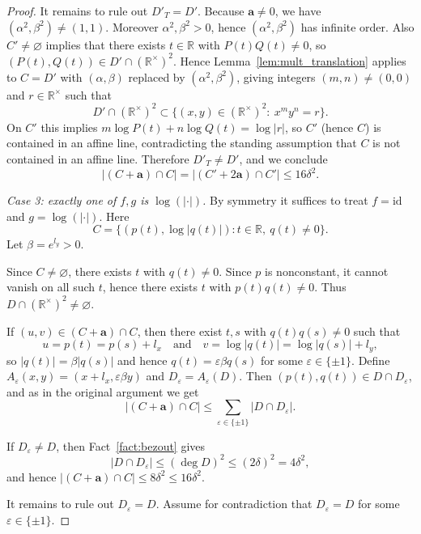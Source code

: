 \documentclass[12pt,reqno]{amsart}
\numberwithin{equation}{section}
\begin{document}
\begin{proof}
It remains to rule out $D'_T=D'$.
Because $\mathbf a\neq 0$, we have $(\alpha^2,\beta^2)\neq(1,1)$. Moreover $\alpha^2,\beta^2>0$, hence $(\alpha^2,\beta^2)$ has infinite order.
Also $C'\neq\varnothing$ implies that there exists $t\in\mathbb R$ with $P(t)Q(t)\neq0$, so $(P(t),Q(t))\in D'\cap(\mathbb R^\times)^2$.
Hence Lemma~\ref{lem:mult_translation} applies to $C=D'$ with $(\alpha,\beta)$ replaced by $(\alpha^2,\beta^2)$, giving integers $(m,n)\neq(0,0)$ and $r\in\mathbb R^\times$ such that
\[
D'\cap(\mathbb R^\times)^2\subset\{(x,y)\in(\mathbb R^\times)^2:\ x^m y^n=r\}.
\]
On $C'$ this implies $m\log P(t)+n\log Q(t)=\log|r|$, so $C'$ (hence $C$) is contained in an affine line,
contradicting the standing assumption that $C$ is not contained in an affine line.
Therefore $D'_T\neq D'$, and we conclude
\[
|(C+\mathbf a)\cap C|=|(C'+2\mathbf a)\cap C'|\le 16\delta^2.
\]

\smallskip\noindent
\emph{Case 3: exactly one of $f,g$ is $\log(|\cdot|)$.}
By symmetry it suffices to treat $f=\mathrm{id}$ and $g=\log(|\cdot|)$.
Here
\[
C=\{(p(t),\log|q(t)|): t\in\mathbb R,\ q(t)\neq 0\}.
\]
Let $\beta=e^{l_y}>0$.


Since $C\neq\varnothing$, there exists $t$ with $q(t)\neq 0$.
Since $p$ is nonconstant, it cannot vanish on all such $t$, hence there exists $t$ with $p(t)q(t)\neq 0$.
Thus $D\cap(\mathbb R^\times)^2\neq\varnothing$.

If $(u,v)\in (C+\mathbf a)\cap C$, then there exist $t,s$ with $q(t)q(s)\neq 0$ such that
\[
u=p(t)=p(s)+l_x
\quad\text{and}\quad
v=\log|q(t)|=\log|q(s)|+l_y,
\]
so $|q(t)|=\beta|q(s)|$ and hence $q(t)=\varepsilon\beta q(s)$ for some $\varepsilon\in\{\pm 1\}$.
Define $A_\varepsilon(x,y)=(x+l_x,\varepsilon\beta y)$ and $D_\varepsilon=A_\varepsilon(D)$.
Then $(p(t),q(t))\in D\cap D_\varepsilon$, and as in the original argument we get
\[
|(C+\mathbf a)\cap C|\le \sum_{\varepsilon\in\{\pm 1\}} |D\cap D_\varepsilon|.
\]

If $D_\varepsilon\neq D$, then Fact~\ref{fact:bezout} gives
\[
|D\cap D_\varepsilon|\le (\deg D)^2\le (2\delta)^2=4\delta^2,
\]
and hence $|(C+\mathbf a)\cap C|\le 8\delta^2\le 16\delta^2$.

It remains to rule out $D_\varepsilon=D$.
Assume for contradiction that $D_\varepsilon=D$ for some $\varepsilon\in\{\pm1\}$.


\end{proof}
\end{document}
